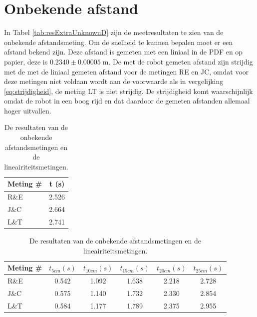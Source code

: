 \documentclass{report}
\begin{document}
\section{Onbekende afstand}

In Tabel \ref{tab:resExtraUnknownD} zijn de meetresultaten te zien van de onbekende afstandsmeting.
Om de snelheid te kunnen bepalen moet er een afstand bekend zijn. Deze afstand is gemeten met een liniaal in de PDF en op papier,
deze is $0.2340 \pm 0.00005\;\mathrm{m}$.
De met de robot gemeten afstand zijn strijdig met de met de liniaal gemeten afstand voor de metingen RE en JC,
omdat voor deze metingen niet voldaan wordt aan de voorwaarde als in vergelijking \ref{eq:strijdigheid}, de meting LT is niet strijdig.
De strijdigheid komt waarschijnlijk omdat de robot in een boog rijd en dat daardoor de gemeten afstanden allemaal hoger uitvallen.


\begin{table}
	\centering
	\caption{De resultaten van de onbekende afstandsmetingen en de lineairiteitsmetingen.}

	\begin{subtable}[b]{0.33\linewidth}
		\centering
		\label{tab:resExtraUnknownD}
		\begin{tabular}{| l| c|}
		\hline
		  Meting \#  & t (s)\\
		\hline
		  R\&E & 2.526 \\
		\hline
		J\&C & 2.664 \\
		\hline
		L\&T & 2.741 \\
		\hline
		 \end{tabular}
	\end{subtable}
	\begin{subtable}[b]{0.66\linewidth}
		\centering
		\label{tab:resExtraLin}
		\begin{tabular}{| l| c| c| c| c| c|}
		\hline
		  Meting \# & $t_{5cm} (s)$ & $t_{10cm} (s)$ & $t_{15cm} (s)$ & $t_{20cm} (s)$ & $t_{25cm} (s)$\\
		\hline
		  R\&E & 0.542 & 1.092 & 1.638 & 2.218 & 2.728 \\
		\hline
		J\&C & 0.575 & 1.140 & 1.732 & 2.330 & 2.854 \\
		\hline
		L\&T & 0.584 & 1.177 & 1.789 & 2.375 & 2.955 \\
		\hline
		 \end{tabular}
	\end{subtable}
\end{table}
\end{document}
